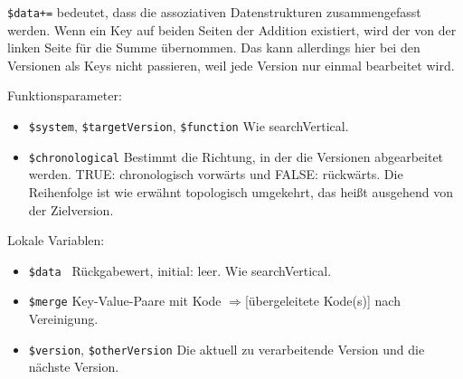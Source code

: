 
\texttt{\$data+=} bedeutet, dass die assoziativen Datenstrukturen zusammengefasst werden. Wenn ein Key auf beiden Seiten der Addition existiert, wird der von der linken Seite für die Summe übernommen. Das kann allerdings hier bei den Versionen als Keys nicht passieren, weil jede Version nur einmal bearbeitet wird. 


Funktionsparameter:

\begin{itemize}
\item \texttt{\$system}, \texttt{\$targetVersion}, \texttt{\$function}  \newline Wie searchVertical. 
\item \texttt{\$chronological}
\newline Bestimmt die Richtung, in der die Versionen abgearbeitet werden. TRUE: chronologisch vorwärts und FALSE: rückwärts. Die Reihenfolge ist wie erwähnt topologisch umgekehrt, das heißt ausgehend von der Zielversion. 
\end{itemize}

Lokale Variablen:

\begin{itemize}
\item \texttt{\$data \hspace{3em}} Rückgabewert, initial: leer.
\newline Wie searchVertical. %
\item \texttt{\$merge} \newline Key-Value-Paare mit Kode $\Rightarrow$[übergeleitete Kode(s)] nach Vereinigung.
\item \texttt{\$version}, \texttt{\$otherVersion} \newline Die aktuell zu verarbeitende Version und die nächste Version. %
\end{itemize}

